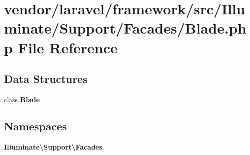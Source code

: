\section{vendor/laravel/framework/src/\+Illuminate/\+Support/\+Facades/\+Blade.php File Reference}
\label{_blade_8php}
\subsection*{Data Structures}
\begin{DoxyCompactItemize}
\item 
class {\bf Blade}
\end{DoxyCompactItemize}
\subsection*{Namespaces}
\begin{DoxyCompactItemize}
\item 
 {\bf Illuminate\textbackslash{}\+Support\textbackslash{}\+Facades}
\end{DoxyCompactItemize}
